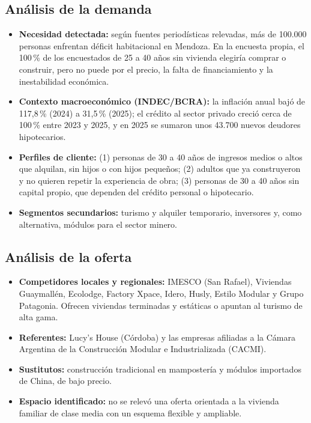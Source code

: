 \documentclass[11pt,a4paper]{article}
\begin{document}
\subsection{Análisis de la demanda}
\begin{itemize}
  \item \textbf{Necesidad detectada:} según fuentes periodísticas relevadas, más de 100.000 personas enfrentan déficit habitacional en Mendoza. En la encuesta propia, el 100\,\% de los encuestados de 25 a 40 años sin vivienda elegiría comprar o construir, pero no puede por el precio, la falta de financiamiento y la inestabilidad económica.
  \item \textbf{Contexto macroeconómico (INDEC/BCRA):} la inflación anual bajó de 117,8\,\% (2024) a 31,5\,\% (2025); el crédito al sector privado creció cerca de 100\,\% entre 2023 y 2025, y en 2025 se sumaron unos 43.700 nuevos deudores hipotecarios.
  \item \textbf{Perfiles de cliente:} (1) personas de 30 a 40 años de ingresos medios o altos que alquilan, sin hijos o con hijos pequeños; (2) adultos que ya construyeron y no quieren repetir la experiencia de obra; (3) personas de 30 a 40 años sin capital propio, que dependen del crédito personal o hipotecario.
  \item \textbf{Segmentos secundarios:} turismo y alquiler temporario, inversores y, como alternativa, módulos para el sector minero.
\end{itemize}

\subsection{Análisis de la oferta}
\begin{itemize}
  \item \textbf{Competidores locales y regionales:} IMESCO (San Rafael), Viviendas Guaymallén, Ecolodge, Factory Xpace, Idero, Husly, Estilo Modular y Grupo Patagonia. Ofrecen viviendas terminadas y estáticas o apuntan al turismo de alta gama.
  \item \textbf{Referentes:} Lucy's House (Córdoba) y las empresas afiliadas a la Cámara Argentina de la Construcción Modular e Industrializada (CACMI).
  \item \textbf{Sustitutos:} construcción tradicional en mampostería y módulos importados de China, de bajo precio.
  \item \textbf{Espacio identificado:} no se relevó una oferta orientada a la vivienda familiar de clase media con un esquema flexible y ampliable.
\end{itemize}
\end{document}
